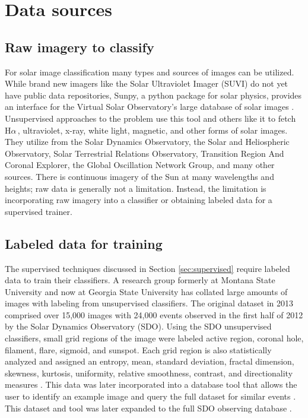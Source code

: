 \documentclass[twoside]{report}
\newcommand{\halpha}{H$\alpha$\,}
\begin{document}
\section{Data sources}
\subsection{Raw imagery to classify} 
For solar image classification many types and sources of images can be utilized. While brand new imagers like the Solar Ultraviolet Imager (SUVI) do not yet have public data repositories, Sunpy, a python package for solar physics, provides an interface for the Virtual Solar Observatory's large database of solar images \cite{sunpy}. Unsupervised approaches to the problem use this tool and others like it to fetch \halpha, ultraviolet, x-ray, white light, magnetic, and other forms of solar images. They utilize from the Solar Dynamics Observatory, the Solar and Heliospheric Observatory, Solar Terrestrial Relations Observatory, Transition Region And Coronal Explorer, the Global Oscillation Network Group, and many other sources. There is continuous imagery of the Sun at many wavelengths and heights; raw data is generally not a limitation. Instead, the limitation is incorporating raw imagery into a classifier or obtaining labeled data for a supervised trainer. 

\subsection{Labeled data for training} 
The supervised techniques discussed in Section \ref{sec:supervised} require labeled data to train their classifiers. A research group formerly at Montana State University and now at Georgia State University has collated large amounts of images with labeling from unsupervised classifiers. The original dataset in 2013 comprised over 15,000 images with 24,000 events observed in the first half of 2012 by the Solar Dynamics Observatory (SDO). Using the SDO unsupervised classifiers, small grid regions of the image were labeled active region, coronal hole, filament, flare, sigmoid, and sunspot. Each grid region is also statistically analyzed and assigned an entropy, mean, standard deviation, fractal dimension, skewness, kurtosis, uniformity, relative smoothness, contrast, and directionality measures \cite{schuh:2013}. This data was later incorporated into a database tool that allows the user to identify an example image and query the full dataset for similar events \cite{banda:2014}. This dataset and tool was later expanded to the full SDO observing database \cite{schuh:2016}. 
\end{document}
